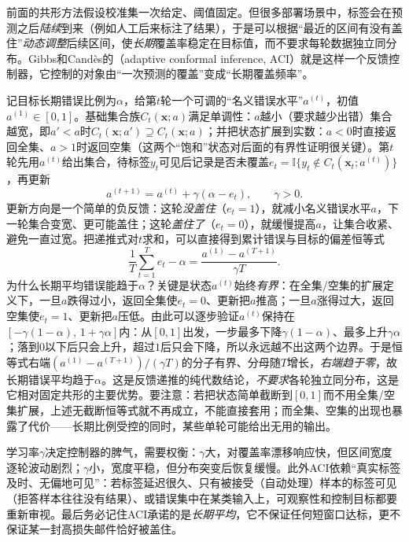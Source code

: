 前面的共形方法假设校准集一次给定、阈值固定。但很多部署场景中，标签会在预测之后\emph{陆续}到来（例如人工后来标注了结果），于是可以根据“最近的区间有没有盖住”\emph{动态调整}后续区间，使\emph{长期}覆盖率稳定在目标值，而不要求每轮数据独立同分布。Gibbs和Candès的（adaptive conformal inference, ACI）就是这样一个反馈控制器，它控制的对象由“一次预测的覆盖”变成“长期覆盖频率”。

记目标长期错误比例为$\alpha$，给第$t$轮一个可调的“名义错误水平”$a^{(t)}$，初值$a^{(1)}\in[0,1]$。基础集合族$C_t(\bm{x};a)$满足单调性：$a$越小（要求越少出错）集合越宽，即$a'<a$时$C_t(\bm{x};a')\supseteq C_t(\bm{x};a)$；并把状态扩展到实数：$a<0$时直接返回全集、$a>1$时返回空集（这两个“饱和”状态对后面的有界性证明很关键）。第$t$轮先用$a^{(t)}$给出集合，待标签$y_t$可见后记录是否未覆盖$e_t=\mathbb I\{y_t\notin C_t(\bm{x}_t;a^{(t)})\}$，再更新
\begin{equation}
 a^{(t+1)}=a^{(t)}+\gamma(\alpha-e_t),
 \qquad \gamma>0.
 \label{eq:reliability-aci}
\end{equation}
更新方向是一个简单的负反馈：这轮\emph{没盖住}（$e_t=1$），就减小名义错误水平$a$，下一轮集合变宽、更可能盖住；这轮\emph{盖住了}（$e_t=0$），就缓慢提高$a$，让集合收紧、避免一直过宽。把递推式对$t$求和，可以直接得到累计错误与目标的偏差恒等式
\[
 \frac1T\sum_{t=1}^{T}e_t-\alpha
 =\frac{a^{(1)}-a^{(T+1)}}{\gamma T}.
\]
为什么长期平均错误能趋于$\alpha$？关键是状态$a^{(t)}$始终\emph{有界}：在全集/空集的扩展定义下，一旦$a$跌得过小，返回全集使$e_t=0$、更新把$a$推高；一旦$a$涨得过大，返回空集使$e_t=1$、更新把$a$压低。由此可以逐步验证$a^{(t)}$保持在$[-\gamma(1-\alpha),\,1+\gamma\alpha]$内：从$[0,1]$出发，一步最多下降$\gamma(1-\alpha)$、最多上升$\gamma\alpha$；落到$0$以下后只会上升，超过$1$后只会下降，所以永远越不出这两个边界。于是恒等式右端$(a^{(1)}-a^{(T+1)})/(\gamma T)$的分子有界、分母随$T$增长，\emph{右端趋于零}，故长期错误平均趋于$\alpha$。这是反馈递推的纯代数结论，\emph{不要求}各轮独立同分布，这是它相对固定共形的主要优势。要注意：若把状态简单截断到$[0,1]$而不用全集/空集扩展，上述无截断恒等式就不再成立，不能直接套用；而全集、空集的出现也暴露了代价——长期比例受控的同时，某些单轮可能给出无用的输出。

学习率$\gamma$决定控制器的脾气，需要权衡：$\gamma$大，对覆盖率漂移响应快，但区间宽度逐轮波动剧烈；$\gamma$小，宽度平稳，但分布突变后恢复缓慢。此外ACI依赖“真实标签及时、无偏地可见”：若标签延迟很久、只有被接受（自动处理）样本的标签可见（拒答样本往往没有结果）、或错误集中在某类输入上，可观察性和控制目标都要重新审视。最后务必记住ACI承诺的是\emph{长期平均}，它不保证任何短窗口达标，更不保证某一封高损失邮件恰好被盖住。

